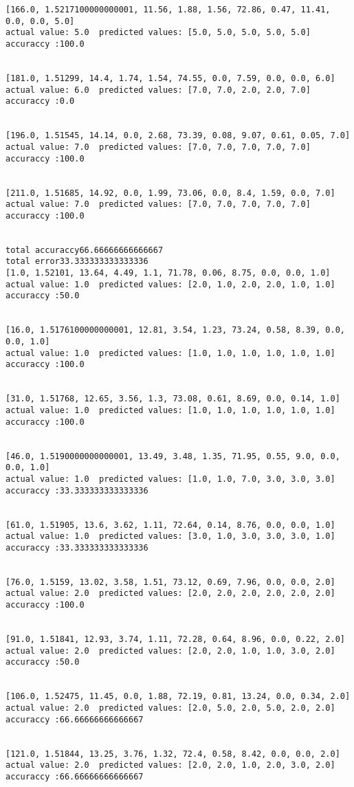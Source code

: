 \documentclass[11pt]{article}
\begin{document}
\begin{Verbatim}[commandchars=\\\{\}]
[166.0, 1.5217100000000001, 11.56, 1.88, 1.56, 72.86, 0.47, 11.41, 0.0, 0.0, 5.0]
actual value: 5.0  predicted values: [5.0, 5.0, 5.0, 5.0, 5.0]
accuraccy :100.0


[181.0, 1.51299, 14.4, 1.74, 1.54, 74.55, 0.0, 7.59, 0.0, 0.0, 6.0]
actual value: 6.0  predicted values: [7.0, 7.0, 2.0, 2.0, 7.0]
accuraccy :0.0


[196.0, 1.51545, 14.14, 0.0, 2.68, 73.39, 0.08, 9.07, 0.61, 0.05, 7.0]
actual value: 7.0  predicted values: [7.0, 7.0, 7.0, 7.0, 7.0]
accuraccy :100.0


[211.0, 1.51685, 14.92, 0.0, 1.99, 73.06, 0.0, 8.4, 1.59, 0.0, 7.0]
actual value: 7.0  predicted values: [7.0, 7.0, 7.0, 7.0, 7.0]
accuraccy :100.0


total accuraccy66.66666666666667
total error33.333333333333336
[1.0, 1.52101, 13.64, 4.49, 1.1, 71.78, 0.06, 8.75, 0.0, 0.0, 1.0]
actual value: 1.0  predicted values: [2.0, 1.0, 2.0, 2.0, 1.0, 1.0]
accuraccy :50.0


[16.0, 1.5176100000000001, 12.81, 3.54, 1.23, 73.24, 0.58, 8.39, 0.0, 0.0, 1.0]
actual value: 1.0  predicted values: [1.0, 1.0, 1.0, 1.0, 1.0, 1.0]
accuraccy :100.0


[31.0, 1.51768, 12.65, 3.56, 1.3, 73.08, 0.61, 8.69, 0.0, 0.14, 1.0]
actual value: 1.0  predicted values: [1.0, 1.0, 1.0, 1.0, 1.0, 1.0]
accuraccy :100.0


[46.0, 1.5190000000000001, 13.49, 3.48, 1.35, 71.95, 0.55, 9.0, 0.0, 0.0, 1.0]
actual value: 1.0  predicted values: [1.0, 1.0, 7.0, 3.0, 3.0, 3.0]
accuraccy :33.333333333333336


[61.0, 1.51905, 13.6, 3.62, 1.11, 72.64, 0.14, 8.76, 0.0, 0.0, 1.0]
actual value: 1.0  predicted values: [3.0, 1.0, 3.0, 3.0, 3.0, 1.0]
accuraccy :33.333333333333336


[76.0, 1.5159, 13.02, 3.58, 1.51, 73.12, 0.69, 7.96, 0.0, 0.0, 2.0]
actual value: 2.0  predicted values: [2.0, 2.0, 2.0, 2.0, 2.0, 2.0]
accuraccy :100.0


[91.0, 1.51841, 12.93, 3.74, 1.11, 72.28, 0.64, 8.96, 0.0, 0.22, 2.0]
actual value: 2.0  predicted values: [2.0, 2.0, 1.0, 1.0, 3.0, 2.0]
accuraccy :50.0


[106.0, 1.52475, 11.45, 0.0, 1.88, 72.19, 0.81, 13.24, 0.0, 0.34, 2.0]
actual value: 2.0  predicted values: [2.0, 5.0, 2.0, 5.0, 2.0, 2.0]
accuraccy :66.66666666666667


[121.0, 1.51844, 13.25, 3.76, 1.32, 72.4, 0.58, 8.42, 0.0, 0.0, 2.0]
actual value: 2.0  predicted values: [2.0, 2.0, 1.0, 2.0, 3.0, 2.0]
accuraccy :66.66666666666667



\end{Verbatim}
\end{document}

